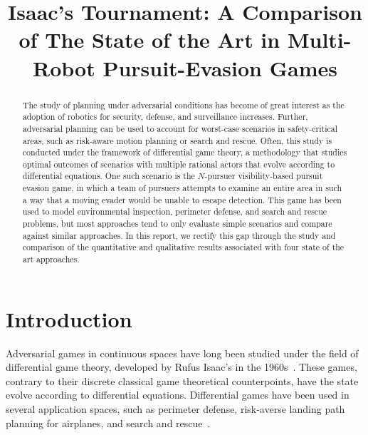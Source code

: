 \documentclass[conference]{IEEEtran}
\begin{document}
\title{Isaac's Tournament: A Comparison of The State of the Art in Multi-Robot Pursuit-Evasion Games}

\author{
}

\maketitle

\begin{abstract}
	The study of planning under adversarial conditions has become of great interest as the adoption of robotics for security, defense, and surveillance increases. 
	Further, adversarial planning can be used to account for worst-case scenarios in safety-critical areas, such as risk-aware motion planning or search and rescue.
	Often, this study is conducted under the framework of differential game theory, a methodology that studies optimal outcomes of scenarios with multiple rational actors that evolve according to differential equations.
    One such scenario is the $N$-pursuer visibility-based pursuit evasion game, in which a team of pursuers attempts to examine an entire area in such a way that a moving evader would be unable to escape detection.
	This game has been used to model environmental inspection, perimeter defense, and search and rescue problems, but most approaches tend to only evaluate simple scenarios and compare against similar approaches.
	In this report, we rectify this gap through the study and comparison of the quantitative and qualitative results associated with four state of the art approaches.
\end{abstract}


\section{Introduction}
Adversarial games in continuous spaces have long been studied under the field of differential game theory, developed by Rufus Isaac's in the 1960s~\cite{diff_games}.
These games, contrary to their discrete classical game theoretical counterpoints, have the state evolve according to differential equations.
Differential games have been used in several application spaces, such as perimeter defense, risk-averse landing path planning for airplanes, and search and rescue~\cite{pursuit}.
\end{document}
